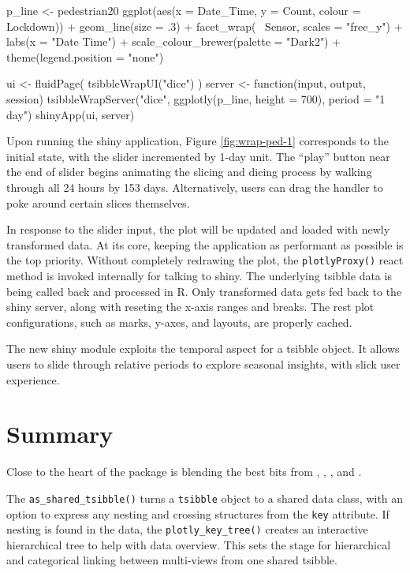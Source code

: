 \begin{Schunk}
\begin{Sinput}
p_line <- pedestrian20 %
  ggplot(aes(x = Date_Time, y = Count, colour = Lockdown)) +
  geom_line(size = .3) +
  facet_wrap(~ Sensor, scales = "free_y") +
  labs(x = "Date Time") +
  scale_colour_brewer(palette = "Dark2") +
  theme(legend.position = "none")

ui <- fluidPage(
  tsibbleWrapUI("dice")
)
server <- function(input, output, session) {
  tsibbleWrapServer("dice", ggplotly(p_line, height = 700), period = "1 day")
}
shinyApp(ui, server)
\end{Sinput}
\end{Schunk}

Upon running the shiny application, Figure \ref{fig:wrap-ped-1}
corresponds to the initial state, with the slider incremented by 1-day
unit. The ``play'' button near the end of slider begins animating the
slicing and dicing process by walking through all 24 hours by 153 days.
Alternatively, users can drag the handler to poke around certain slices
themselves.

In response to the slider input, the plot will be updated and loaded
with newly transformed data. At its core, keeping the application as
performant as possible is the top priority. Without completely redrawing
the plot, the \texttt{plotlyProxy()} react method is invoked internally
for talking to shiny. The underlying tsibble data is being called back
and processed in R. Only transformed data gets fed back to the shiny
server, along with reseting the x-axis ranges and breaks. The rest plot
configurations, such as marks, y-axes, and layouts, are properly cached.

The new shiny module exploits the temporal aspect for a tsibble object.
It allows users to slide through relative periods to explore seasonal
insights, with slick user experience.

\hypertarget{summary}{%
\section{Summary}\label{summary}}

Close to the heart of the  package is blending the
best bits from , , ,
and .

The \texttt{as\_shared\_tsibble()} turns a \texttt{tsibble} object to a
shared data class, with an option to express any nesting and crossing
structures from the \texttt{key} attribute. If nesting is found in the
data, the \texttt{plotly\_key\_tree()} creates an interactive
hierarchical tree to help with data overview. This sets the stage for
hierarchical and categorical linking between multi-views from one shared
tsibble.

